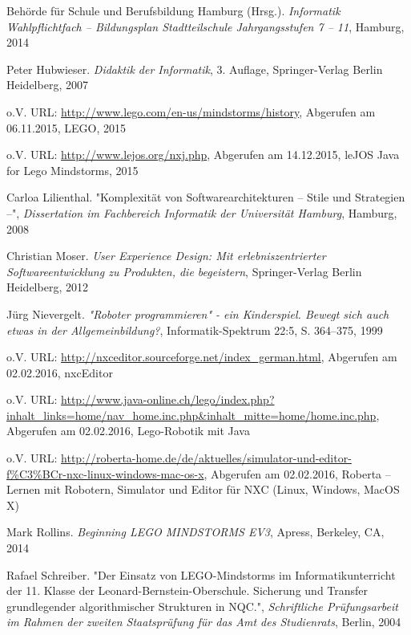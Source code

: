 \begin{thebibliography}{ABCDEF}
Behörde für Schule und Berufsbildung Hamburg (Hrsg.). \emph{Informatik Wahlpflichtfach -- Bildungsplan Stadtteilschule Jahrgangsstufen 7 -- 11}, Hamburg, 2014

Peter Hubwieser. \emph{Didaktik der Informatik}, 3. Auflage, Springer-Verlag Berlin Heidelberg, 2007


o.V. URL: \url{http://www.lego.com/en-us/mindstorms/history}, Abgerufen am 06.11.2015, LEGO, 2015

o.V. URL: \url{http://www.lejos.org/nxj.php}, Abgerufen am 14.12.2015, leJOS Java for Lego Mindstorms, 2015

Carloa Lilienthal. "Komplexität von Softwarearchitekturen -- Stile und Strategien --", \emph{Dissertation im Fachbereich Informatik der Universität Hamburg}, Hamburg, 2008

Christian Moser. \emph{User Experience Design: Mit erlebniszentrierter Softwareentwicklung zu Produkten, die begeistern}, Springer-Verlag Berlin Heidelberg, 2012

Jürg Nievergelt. \emph{"Roboter programmieren" - ein Kinderspiel. Bewegt sich auch etwas in der Allgemeinbildung?}, Informatik-Spektrum 22:5, S. 364--375, 1999

o.V. URL: \url{http://nxceditor.sourceforge.net/index_german.html}, Abgerufen am 02.02.2016, nxcEditor

o.V. URL: \url{http://www.java-online.ch/lego/index.php?inhalt_links=home/nav_home.inc.php&inhalt_mitte=home/home.inc.php}, Abgerufen am 02.02.2016, Lego-Robotik mit Java 

\pagebreak

o.V. URL: \url{http://roberta-home.de/de/aktuelles/simulator-und-editor-f\%C3\%BCr-nxc-linux-windows-mac-os-x}, Abgerufen am 02.02.2016, Roberta -- Lernen mit Robotern, Simulator und Editor für NXC (Linux, Windows, MacOS X)

Mark Rollins. \emph{Beginning LEGO MINDSTORMS EV3}, Apress, Berkeley, CA, 2014

Rafael Schreiber. "Der Einsatz von LEGO-Mindstorms im Informatikunterricht der 11. Klasse der Leonard-Bernstein-Oberschule. Sicherung und Transfer grundlegender algorithmischer Strukturen in NQC.", \emph{Schriftliche Prüfungsarbeit im Rahmen der zweiten Staatsprüfung für das Amt des Studienrats}, Berlin, 2004


\end{thebibliography}
